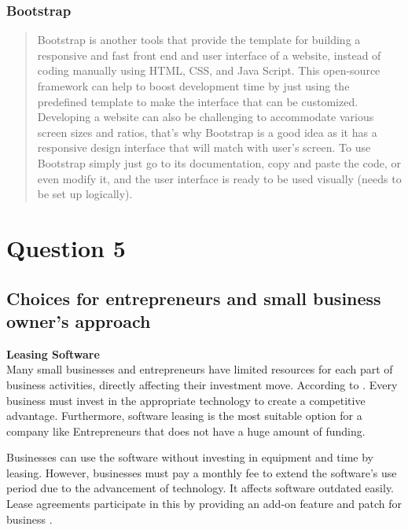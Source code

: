 \documentclass[12pt,a4paper]{article}
\begin{document}
\subsubsection{Bootstrap}

\begin{quote}
Bootstrap is another tools that provide the template for building a responsive and fast front end and user interface of a website, instead of coding manually using HTML, CSS, and Java Script. This open-source framework can help to boost development time by just using the predefined template to make the interface that can be customized. Developing a website can also be challenging to accommodate various screen sizes and ratios, that’s why Bootstrap is a good idea as it has a responsive design interface that will match with user’s screen. To use Bootstrap simply just go to its documentation, copy and paste the code, or even modify it, and the user interface is ready to be used visually (needs to be set up logically). 
\end{quote}


\pagebreak

\setcounter{page}{9}
\section{Question 5}
\subsection{Choices for entrepreneurs and small business owner’s approach}
\label{sec:Question 5}

\textbf{Leasing Software}\\
Many small businesses and entrepreneurs have limited resources for each part of business activities, directly affecting their investment move. According to \cite{question_5.1}. Every business must invest in the appropriate technology to create a competitive advantage. Furthermore, software leasing is the most suitable option for a company like Entrepreneurs that does not have a huge amount of funding. 

\noindent Businesses can use the software without investing in equipment and time by leasing. However, businesses must pay a monthly fee to extend the software's use period due to the advancement of technology. It affects software outdated easily. Lease agreements participate in this by providing an add-on feature and patch for business \citep{question_5.1}.
\end{document}
